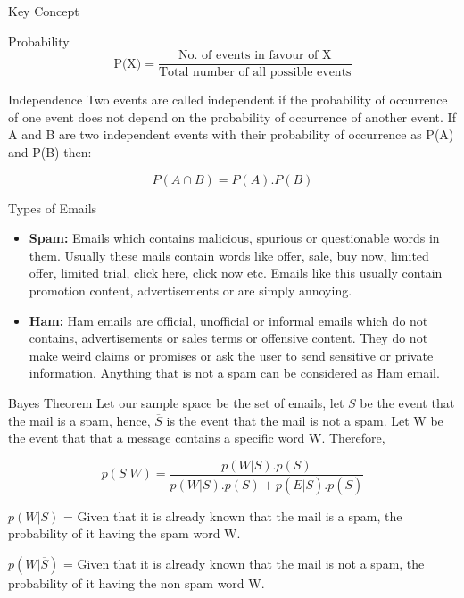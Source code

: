 \begin{frame}{Key Concept}

\begin{block}{Probability}
$$
\textrm{P(X)} = \frac{\textrm{No. of events in favour of X}}{\textrm{Total number of all possible events}}
$$
\end{block}

\begin{block}{Independence}
Two events are called independent if the probability of occurrence of one event does not depend on the probability of occurrence of another event. If A and B are two independent events with their probability of occurrence as P(A) and P(B) then:

$$
P(A \cap B) = P(A).P(B)
$$
\end{block}

\end{frame}

\begin{frame}{Types of Emails}

\begin{itemize}
    \item \textbf{Spam:} Emails which contains malicious, spurious or questionable words in them. Usually these mails contain words like offer, sale, buy now, limited offer, limited trial, click here, click now etc. Emails like this usually contain promotion content, advertisements or are simply annoying.
    \item \textbf{Ham:} Ham emails are official, unofficial or informal emails which do not contains, advertisements or sales terms or offensive content. They do not make weird claims or promises or ask the user to send sensitive or private information. Anything that is not a spam can be considered as Ham email.
\end{itemize}

\end{frame}

\begin{frame}{Bayes Theorem}
Let our sample space be the set of emails, let $S$ be the event that the mail is a spam, hence, $\overline{S}$ is the event that the mail is not a spam. Let W be the event that that a message contains a specific word W. Therefore, 

$$
p(S|W) = \dfrac{p(W|S).p(S)}{p(W|S).p(S) + p(E|\overline{S}).p(\overline{S})}
$$

\vspace{5mm}
$p(W|S)$ = Given that it is already known that the mail is a spam, the probability of it having the spam word W.
\vspace{5mm}

$p(W|\overline{S})$ = Given that it is already known that the mail is not a spam, the probability of it having the non spam word W.
\end{frame}

